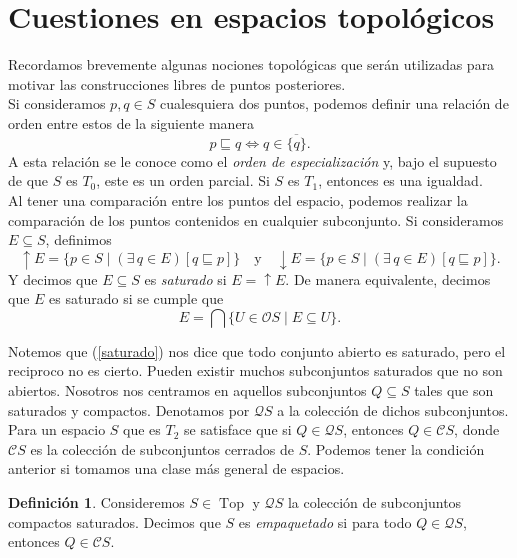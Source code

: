 \documentclass[11pt]{amsart}
\DeclareMathOperator{\Top}{Top}
\theoremstyle{plain}
\theoremstyle{definition}
\newtheorem{dfn}[thm]{Definición}
\begin{document}
\section{Cuestiones en espacios topológicos}
Recordamos brevemente algunas nociones topológicas que serán utilizadas para motivar las construcciones libres de puntos posteriores.\\

Si consideramos $p, q\in S$ cualesquiera dos puntos, podemos definir una relación de orden entre estos de la siguiente manera
\[
p\sqsubseteq q\iff q\in \overline{\{q\}}.
\]
A esta relación se le conoce como el \emph{orden de especialización} y, bajo el supuesto de que $S$ es $T_0$, este es un orden parcial. Si $S$ es $T_1$, entonces es una igualdad.\\

Al tener una comparación entre los puntos del espacio, podemos realizar la comparación de los puntos contenidos en cualquier subconjunto. Si consideramos $E\subseteq S$, definimos
\[
\uparrow E=\{p\in S\mid (\exists\, q\in E)[q\sqsubseteq p]\} \quad \text{y}\quad \downarrow E=\{p\in S\mid (\exists\, q\in E)[q\sqsubseteq p]\}.
\]
Y decimos que $E\subseteq S$ es \emph{saturado} si $E=\uparrow E$. De manera equivalente, decimos que $E$ es saturado si se cumple que
\begin{equation}\label{saturado}
E=\bigcap\{U\in \mathcal{O}S\mid E\subseteq U\}.
\end{equation}

Notemos que (\ref{saturado}) nos dice que todo conjunto abierto es saturado, pero el reciproco no es cierto. Pueden existir muchos subconjuntos
saturados que no son abiertos. Nosotros nos centramos en aquellos subconjuntos $Q\subseteq S$ tales que son saturados y compactos. Denotamos por $\mathcal{Q}S$ 
a la colección de dichos subconjuntos.\\

Para un espacio $S$ que es $T_2$ se satisface que si $Q\in \mathcal{Q}S$, entonces $Q\in \mathcal{C}S$, donde $\mathcal{C}S$ es la colección
de subconjuntos cerrados de $S$. Podemos tener la condición anterior si tomamos una clase más general de espacios.

\begin{dfn}\label{empaquetado}
Consideremos $S\in \Top$ y $\mathcal{Q}S$ la colección de subconjuntos compactos saturados. Decimos que $S$ es \emph{empaquetado}
si para todo $Q\in \mathcal{Q}S$, entonces $Q\in \mathcal{C}S$.
\end{dfn}
\end{document}
